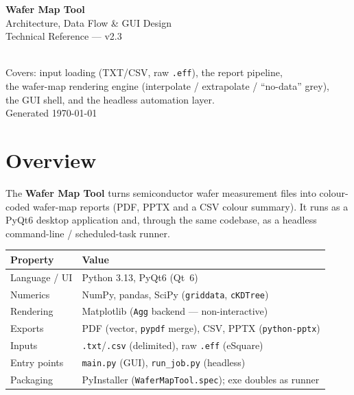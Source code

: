 \documentclass[11pt,a4paper]{article}
\begin{document}
\begin{titlepage}
\centering
\vspace*{3cm}
{\Huge\bfseries Wafer Map Tool}\\[4pt]
{\Large Architecture, Data Flow \& GUI Design}\\[6pt]
{\large Technical Reference --- v2.3}\\[2cm]
\\[2cm]
{\large Covers: input loading (TXT/CSV, raw \texttt{.eff}), the report pipeline,\\
the wafer-map rendering engine (interpolate / extrapolate / ``no-data'' grey),\\
the GUI shell, and the headless automation layer.}\\[1cm]
{\normalsize Generated \today}
\vfill
\end{titlepage}

\tableofcontents
\newpage

\section{Overview}
The \textbf{Wafer Map Tool} turns semiconductor wafer measurement files into
colour-coded wafer-map reports (PDF, PPTX and a CSV colour summary). It runs
as a PyQt6 desktop application and, through the same codebase, as a headless
command-line / scheduled-task runner.

\begin{center}\small
\begin{tabular}{@{}ll@{}}
\toprule
\textbf{Property} & \textbf{Value}\\
\midrule
Language / UI & Python 3.13, PyQt6 (Qt~6) \\
Numerics & NumPy, pandas, SciPy (\texttt{griddata}, \texttt{cKDTree}) \\
Rendering & Matplotlib (\texttt{Agg} backend --- non-interactive) \\
Exports & PDF (vector, \texttt{pypdf} merge), CSV, PPTX (\texttt{python-pptx}) \\
Inputs & \texttt{.txt}/\texttt{.csv} (delimited), raw \texttt{.eff} (eSquare) \\
Entry points & \texttt{main.py} (GUI), \texttt{run\_job.py} (headless) \\
Packaging & PyInstaller (\texttt{WaferMapTool.spec}); exe doubles as runner \\
\bottomrule
\end{tabular}
\end{center}
\end{document}
